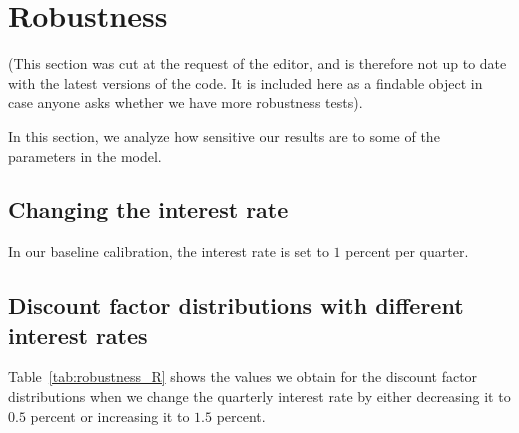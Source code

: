 \documentclass[\latexroot/\projectname]{subfiles}
\begin{document}
\FloatBarrier
\hypertarget{robustness}{}

\section*{Robustness}
\whenintegrated{\label{sec:robustness}} %

(This section was cut at the request of the editor, and is therefore not up to date with the latest versions of the code.  It is included here as a findable object in case anyone asks whether we have more robustness tests).

In this section, we analyze how sensitive our results are to some of the parameters in the model. 

\hypertarget{changing-the-interest-rate}{}\par\subsection*{Changing the interest rate}
\whenintegrated{\label{sec:robust_R}} %
In our baseline calibration, the interest rate is set to $1$ percent per quarter. 

\subsection*{Discount factor distributions with different interest rates}
\whenintegrated{\label{sec:robust_R_estim}} %

Table~\ref{tab:robustness_R} shows the values we obtain for the discount factor distributions when we change the quarterly interest rate by either decreasing it to $0.5$ percent or increasing it to $1.5$ percent.
\end{document}
